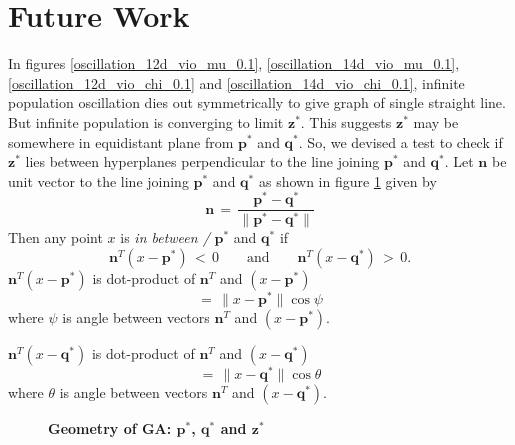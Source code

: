 \section{Future Work}
In figures \ref{oscillation_12d_vio_mu_0.1}, \ref{oscillation_14d_vio_mu_0.1}, 
\ref{oscillation_12d_vio_chi_0.1} and \ref{oscillation_14d_vio_chi_0.1},  
infinite population oscillation dies out symmetrically to 
give graph of single straight line. But infinite population is converging to limit $\bm{z}^\ast$. 
This suggests $\bm{z}^\ast$ may be somewhere in equidistant plane from $\bm{p}^\ast$ and $\bm{q}^\ast$.
So, we devised a test to check if $\bm{z}^\ast$ lies between hyperplanes perpendicular to the line 
joining $\bm{p}^\ast$ and $\bm{q}^\ast$. 
Let $\bm{n}$ be unit vector to the line joining $\bm{p}^\ast$ and $\bm{q}^\ast$ as shown in figure \ref{pqz} given by
\[
  \bm{n} \,=\, \frac{\bm{p}^\ast - \bm{q}^\ast}{\|\bm{p}^\ast-\bm{q}^\ast\|}
\]
Then any point $x$ is {\em in between /} $\bm{p}^\ast$ and $\bm{q}^\ast$ if
\[
  \bm{n}^T(x-\bm{p}^\ast) \,<\, 0 \quad \quad \text{and} \quad \quad \bm{n}^T(x-\bm{q}^\ast) \,>\, 0.
\]
$\bm{n}^T(x-\bm{p}^\ast)$ is dot-product of $\bm{n}^T$ and $(x-\bm{p}^\ast)$
\[
  =\, \|x-\bm{p}^\ast\| \cos \psi
\]
where $\psi$ is angle between vectors $\bm{n}^T$ and $(x-\bm{p}^\ast)$.

$\bm{n}^T(x-\bm{q}^\ast)$ is dot-product of $\bm{n}^T$ and $(x-\bm{q}^\ast)$
\[
  =\, \|x-\bm{q}^\ast\| \cos \theta
\]
where $\theta$ is angle between vectors $\bm{n}^T$ and $(x-\bm{q}^\ast)$.

\begin{figure}[!ht]
\begin{center}
\hspace{-3em}%
\caption[\textbf{Geometry of GA:  $\bm{p}^\ast$, $\bm{q}^\ast$ and $\bm{z}^\ast$}]
{\textbf{Geometry of GA:  $\bm{p}^\ast$, $\bm{q}^\ast$ and $\bm{z}^\ast$}}
\label{pqz}
\end{center}
\end{figure}

